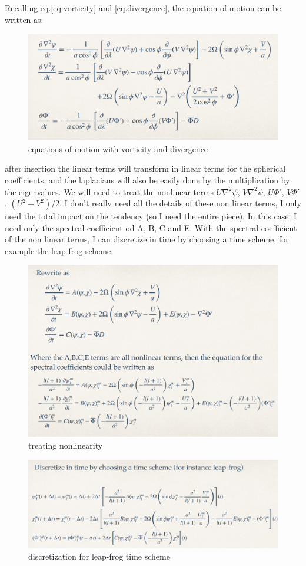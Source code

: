 Recalling eq.\ref{eq.vorticity} and \ref{eq.divergence}, the equation of motion can be written as:
\begin{figure}[h]
	\centering
	\includegraphics[width=0.5\linewidth]{uploads/Screenshot 2024-11-18 094959.png}
	\caption{equations of motion with vorticity and divergence}
	\label{fig.eqmotion}
\end{figure}
after insertion the linear terms will transform in linear terms for the spherical coefficients, and the laplacians will also be easily done by the multiplication by the eigenvalues. We will need to treat the nonlinear terms $U\nabla^2\psi$, $V\nabla^2\psi$, $U\Phi'$, $V\Phi'$, $(U^2+V^2)/2$.  I don't really need all the details of these non linear terms, I only need the total impact on the tendency (so I need the entire piece). In this case. I need only the spectral coefficient od A, B, C and E. With the spectral coefficient of the non linear terms, I can discretize in time by choosing a time scheme, for example the leap-frog scheme.
\begin{figure}[h]
	\centering
	\includegraphics[width=0.5\linewidth]{uploads/Screenshot 2024-11-18 095232.png}
	\caption{treating nonlinearity}
	\label{fig:trating nonlinearity}
\end{figure}
\begin{figure}[h]
	\centering
	\includegraphics[width=0.5\linewidth]{uploads/Screenshot 2024-11-18 095428.png}
	\caption{discretization for leap-frog time scheme}
	\label{fig:discretization for leap-frog time scheme}
\end{figure}
